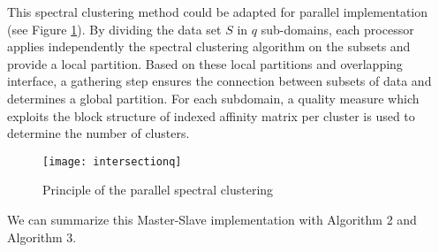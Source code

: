 \documentclass{llncs}
\begin{document}
This spectral clustering method could be adapted for parallel implementation
(see Figure \ref{parallel}).
By dividing the data set $S$ in $q$ sub-domains, each processor applies
independently the spectral clustering algorithm on the subsets and provide a
local partition. Based on these local partitions and overlapping interface, a
gathering step ensures the connection between subsets of data and determines a
global partition.  For each subdomain, a quality measure which exploits the
block structure of indexed affinity matrix per cluster is used to determine
the number of clusters.
\begin{figure}
  \begin{center}
  {\texttt{[image: intersectionq]}}
\end{center}
\caption{Principle of the parallel spectral clustering}
\label{parallel}
\end{figure}

We can summarize this Master-Slave implementation with Algorithm 2 and Algorithm 3.
\end{document}
